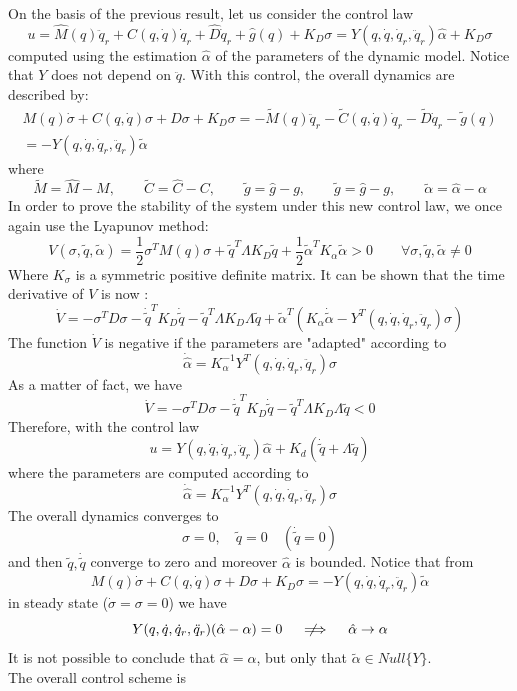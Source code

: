 \documentclass{book}
\newcommand{\notimplies}{%
  \mathrel{{\ooalign{\hidewidth$\not\phantom{=}$\hidewidth\cr$\implies$}}}}
\begin{document}
On the basis of the previous result, let us consider the control law 
\[
    u = \hat{M}(q)\ddot{q}_r+\hat{C}(q,\dot{q})\dot{q}_r+\hat{D}\dot{q}_r+\hat{g}(q)+K_D\sigma = Y(q,\dot{q},\dot{q}_r,\ddot{q}_r)\hat{\alpha}+K_D\sigma
\]
computed using the estimation $\hat{\alpha}$ of the parameters of the dynamic model.
Notice that $Y$ does not depend on $\ddot{q}$. 
With this control, the overall dynamics are described by:
\begin{gather*}
    M(q)\dot{\sigma}+C(q,\dot{q})\sigma+D\sigma+K_D\sigma=-\tilde{M}(q)\ddot{q}_r-\tilde{C}(q,\dot{q})\dot{q}_r-\tilde{D}\dot{q}_r-\tilde{g}(q)\\
    =-Y(q,\dot{q},\dot{q}_r,\ddot{q}_r)\tilde{\alpha}
\end{gather*}
where
\[
    \tilde{M}=\hat{M}-M, \qquad \tilde{C}=\hat{C}-C, \qquad \tilde{g}=\hat{g}-g, \qquad \tilde{g}=\hat{g}-g, \qquad \tilde{\alpha}=\hat{\alpha}-\alpha 
\]
In order to prove the stability of the system under this new control law, we once again use the Lyapunov method: 
\[
    V(\sigma,\tilde{q},\tilde{\alpha})=\displaystyle\frac{1}{2}\sigma^TM(q)\sigma+\tilde{q}^T\Lambda K_D\tilde{q}+\displaystyle\frac{1}{2}\tilde{\alpha}^TK_\alpha \tilde{\alpha}>0 \qquad \forall \sigma,\tilde{q},\tilde{\alpha}\neq 0
\]
Where $K_\sigma$ is a symmetric positive definite matrix. It can be shown that the time derivative of $V$ is now : 
\[
    \dot{V}=-\sigma^TD\sigma-\dot{\tilde{q}}^TK_D\dot{\tilde{q}}-\tilde{q}^T\Lambda K_D \Lambda\tilde{q} + \tilde{\alpha}^T(K_\alpha\dot{\tilde{\alpha}}-Y^T(q,\dot{q},\dot{q}_r,\ddot{q}_r)\sigma)
\]
The function $\dot{V}$ is negative if the parameters are "adapted" according to 
\[
    \dot{\hat{\alpha}}=K_\alpha^{-1}Y^T(q,\dot{q},\dot{q}_r,\ddot{q}_r)\sigma
\]
As a matter of fact, we have 
\[
    \dot{V}=-\sigma^TD\sigma-\dot{\tilde{q}}^TK_D\dot{\tilde{q}}-\tilde{q}^T\Lambda K_D\Lambda\tilde{q}<0
\]
Therefore, with the control law 
\[
    u=Y(q,\dot{q},\dot{q}_r,\ddot{q}_r)\hat{\alpha}+K_d(\dot{\tilde{q}}+\Lambda\tilde{q})
\]
where the parameters are computed according to 
\[
    \dot{\hat{\alpha}}=K_\alpha^{-1}Y^T(q,\dot{q},\dot{q}_r,\ddot{q}_r)\sigma
\]
The overall dynamics converges to 
\[
    \sigma=0,\quad \tilde{q}=0 \quad (\dot{\tilde{q}}=0)
\]
and then $\tilde{q},\dot{\tilde{q}}$ converge to zero and moreover $\hat{\alpha}$ is bounded. Notice that from 
\[
    M(q)\dot{\sigma}+C(q,\dot{q})\sigma+D\sigma+K_D\sigma=- Y(q,\dot{q},\dot{q}_r,\ddot{q}_r)\tilde{\alpha}
\]
in steady state ($\dot{\sigma}=\sigma=0$) we have 
\[
    Y(q,\dot{q},\dot{q}_r,\ddot{q}_r)(\hat{\alpha}-\alpha)=0\quad \notimplies \quad \hat{\alpha}\to\alpha
\]
It is not possible to conclude that $\hat{\alpha}=\alpha$, but only that $\tilde{\alpha}\in Null\{Y\}$.\\
The overall control scheme is 
\end{document}
